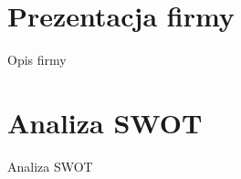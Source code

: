 \documentclass[12pt,a4paper]{article}
\author{Projektowanie i wdrażanie systemów informatycznych\\\\\\\\\\\\\texttt{[image: img/logoPWSZ.eps]}\\\\\\\\Karpiński Maciej\\Krysa Marcin\\Kuczma Łukasz\\Mertuszka Adam\\\\\\\\}
\title{}
\begin{document}
	\maketitle
	\thispagestyle{empty}
	\clearpage

	\tableofcontents
	\newpage

	\section{Prezentacja firmy}
		\indent Opis firmy
	\newpage

	\section{Analiza SWOT}
		\indent Analiza SWOT
	\newpage
	
\end{document}

